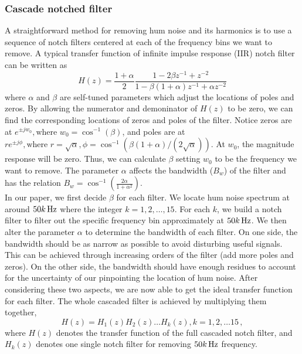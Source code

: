 \documentclass[paper-main.tex]{subfiles}
\begin{document}
\subsubsection{Cascade notched filter}
A straightforward method for removing hum noise and its harmonics is to use a sequence of notch filters centered at each of the frequency bins we want to remove. 
A typical transfer function of infinite impulse response (IIR) notch filter can be written as \citep{10.5555/541204}
\begin{equation}
    \label{eqn:notch}
    H(z)=\frac{1+\alpha}{2}\frac{1-2\beta z^{-1}+z^{-2}}{1-\beta(1+\alpha)z^{-1}+\alpha z^{-2}}
\end{equation}
where $\alpha$ and $\beta$ are self-tuned parameters which adjust the locations of poles and zeros. 
By allowing the numerator and demoninator of $H(z)$ to be zero, we can find the corresponding locations of zeros and poles of the filter. 
Notice zeros are at $e^{\pm jw_0}, \text{where } w_0=\cos^{-1}(\beta)$, and poles are at $re^{\pm j\phi}, \text{where } r=\sqrt{\alpha},\phi=\cos^{-1}(\beta(1+\alpha)/(2\sqrt{\alpha}))$.
At $w_0$, the magnitude response will be zero. 
Thus, we can calculate $\beta$ setting $w_0$ to be the frequency we want to remove. 
The parameter $\alpha$ affects the bandwidth ($B_w$) of the filter and has the relation $B_w=\cos^{-1}(\frac{2\alpha}{1+\alpha^2})$. \\
In our paper, we first decide $\beta$ for each filter. 
We locate hum noise spectrum at around $50k\,{\rm Hz}$ where the integer $k=1,2,\dots,15$. 
For each $k$, we build a notch filter to filter out the specific frequency bin approximately at $50k \, {\rm Hz}$. 
We then alter the parameter $\alpha$ to determine the bandwidth of each filter. 
On one side, the bandwidth should be as narrow as possible to avoid disturbing useful signals. 
This can be achieved through increasing orders of the filter (add more poles and zeros). 
On the other side, the bandwidth should have enough residues to account for the uncertainty of our pinpointing the location of hum noise. 
After considering these two aspects, we are now able to get the ideal transfer function for each filter. 
The whole cascaded filter is achieved by multiplying them together, 
\begin{equation}
    \label{eqn:notch15}
    H(z)=H_1(z)H_2(z)\dots H_k(z),k=1,2,\dots 15\,,
\end{equation}
where $H(z)$ denotes the transfer function of the full cascaded notch filter, and $H_k(z)$ denotes one single notch filter for removing $50k \, {\rm Hz}$ frequency. 
\end{document}
